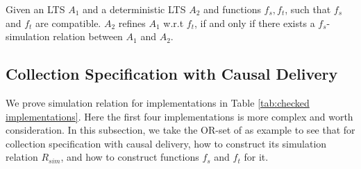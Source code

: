 
\begin{theorem}
\label{theorem:equivalence of our simulation and refinement}
Given an LTS $A_1$ and a deterministic LTS $A_2$ and functions $f_s,f_t$, such that $f_s$ and $f_t$ are compatible. $A_2$ refines $A_1$ w.r.t $f_t$, if and only if there exists a $f_s$-simulation relation between $A_1$ and $A_2$.
\end{theorem}



\subsection{Collection Specification with Causal Delivery}
\label{subsec:collection specification with calusal delivery}

{\color {red}We prove simulation relation for implementations in Table \ref{tab:checked implementations}. Here the first four implementations is more complex and worth consideration. In this subsection, we take the OR-set of \cite{Shapiro:2011} as example to see that for collection specification with causal delivery, how to construct its simulation relation $R_{\mathit{sim}}$, and how to construct functions $f_s$ and $f_t$ for it.}

